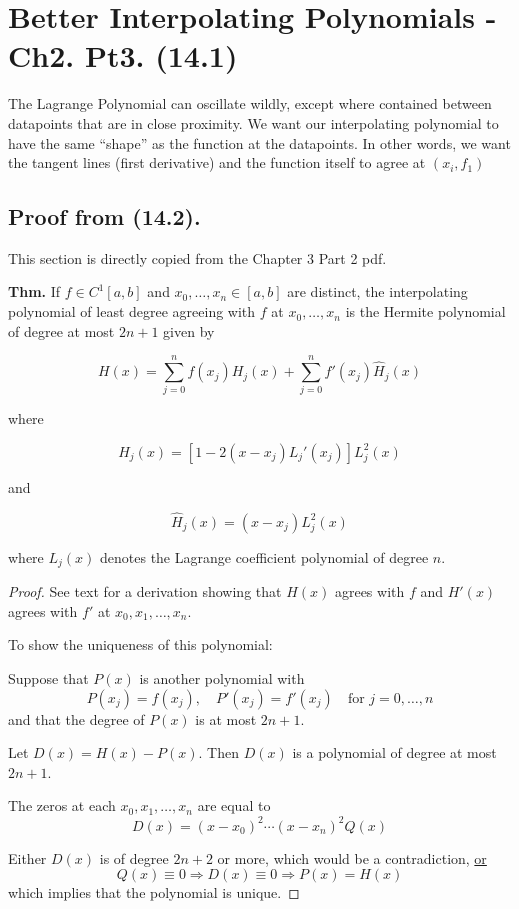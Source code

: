 \documentclass[12pt]{article}
\newcommand{\thm}{\textbf{Thm.}\xspace}
\begin{document}
\section{Better Interpolating Polynomials - Ch2. Pt3. (14.1)}

The Lagrange Polynomial can oscillate wildly, except where contained between
datapoints that are in close proximity. We want our interpolating polynomial to
have the same \enquote{shape} as the function at the datapoints. In other words,
we want the tangent lines (first derivative) and the function itself to agree at
$(x_i, f_1)$

\subsection{Proof from (14.2).} 

This section is directly copied from the Chapter 3 Part 2 pdf.

\thm
If \( f \in C^1[a,b] \) and \( x_0, \ldots, x_n \in [a,b] \) are distinct, the interpolating polynomial of least degree agreeing with \( f \) at \( x_0, \ldots, x_n \) is the Hermite polynomial of degree at most \( 2n+1 \) given by

\[
H(x) = \sum_{j=0}^{n} f(x_j) H_j(x) + \sum_{j=0}^{n} f'(x_j) \hat{H}_j(x)
\]

where

\[
H_j(x) = \left[1 - 2(x - x_j)L_j'(x_j)\right] L_j^2(x)
\]

and

\[
\hat{H}_j(x) = (x - x_j) L_j^2(x)
\]

where \( L_j(x) \) denotes the Lagrange coefficient polynomial of degree \( n \).

\begin{proof}
See text for a derivation showing that \( H(x) \) agrees with \( f \) and \( H'(x) \) agrees with \( f' \) at \( x_0, x_1, \ldots, x_n \).

To show the uniqueness of this polynomial:

Suppose that \( P(x) \) is another polynomial with
\[
P(x_{j}) = f(x_{j}), \quad P'(x_{j}) = f'(x_{j}) \quad \text{for } j = 0, \ldots, n
\]
and that the degree of \( P(x) \) is at most \( 2n+1 \).

Let \( D(x) = H(x) - P(x) \). Then \( D(x) \) is a polynomial of degree at most \( 2n+1 \).

The zeros at each \( x_0, x_1, \ldots, x_n \) are equal to
\[
D(x) = (x - x_0)^2 \cdots (x - x_n)^2 Q(x)
\]

Either \( D(x) \) is of degree \( 2n + 2 \) or more, which would be a contradiction, 
\uline{or}
\[
Q(x) \equiv 0 \Rightarrow D(x) \equiv 0 \Rightarrow P(x) = H(x)
\]
which implies that the polynomial is unique.
\end{proof}
\end{document}
